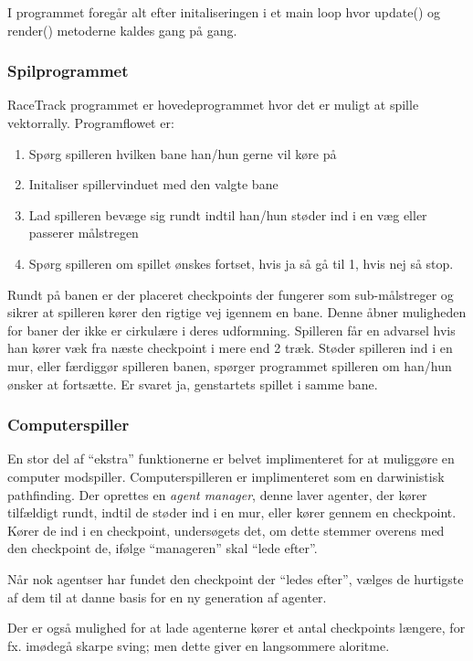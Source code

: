 I programmet foregår alt efter initaliseringen  i et main loop hvor update() og render() metoderne kaldes gang på gang.

\subsubsection{Spilprogrammet}
RaceTrack programmet er hovedeprogrammet hvor det er muligt at spille vektorrally. Programflowet er:
\begin{enumerate}
  \item Spørg spilleren hvilken bane han/hun gerne vil køre på
  \item Initaliser spillervinduet med den valgte bane
  \item Lad spilleren bevæge sig rundt indtil han/hun støder ind i en væg eller passerer målstregen
  \item Spørg spilleren om spillet ønskes fortset, hvis ja så gå til 1, hvis nej så stop.
\end{enumerate}
Rundt på banen er der placeret checkpoints der fungerer som sub-målstreger og sikrer at spilleren kører den rigtige vej igennem en bane.
Denne åbner muligheden for baner der ikke er cirkulære i deres udformning.
Spilleren får en advarsel hvis han kører væk fra næste checkpoint i  mere end 2 træk.
Støder spilleren ind i en mur, eller færdiggør spilleren banen, spørger programmet spilleren om han/hun ønsker at fortsætte.
Er svaret ja, genstartets spillet i samme bane.

\subsubsection{Computerspiller}
En stor del af ``ekstra'' funktionerne er belvet implimenteret for at muliggøre en computer modspiller.
Computerspilleren er implimenteret som en darwinistisk pathfinding.
Der oprettes en \emph{agent manager}, denne laver agenter, der kører tilfældigt rundt,
indtil de støder ind i en mur, eller kører gennem en checkpoint.
Kører de ind i en checkpoint, undersøgets det, om dette stemmer overens med den checkpoint de, ifølge ``manageren'' skal ``lede efter''.

Når nok agentser har fundet den checkpoint der ``ledes efter'', vælges de hurtigste af dem til at danne basis for en ny generation af agenter.

Der er også mulighed for at lade agenterne kører et antal checkpoints længere,
for fx. imødegå skarpe sving; men dette giver en langsommere aloritme.

